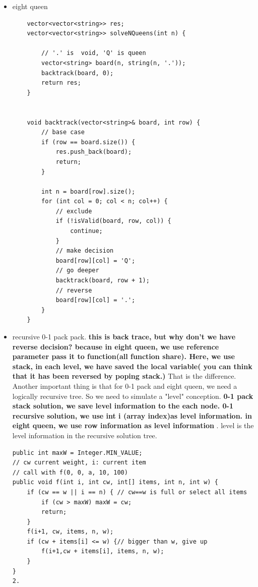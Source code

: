 \documentclass[a4paper,11pt,twoside]{book}
\begin{document}
\begin{itemize}
\begin{lstlisting}
				dp[i][w] = dp[i - 1][w];
			}
			else {
				
				dp[i][w] = max(
				dp[i - 1][w - wt[i - 1]] + val[i - 1],
				dp[i - 1][w]
				);
			}
		}
	}
	
	for (int i = 1; i <= N; i++) {
		for (int w = 1; w <= W; w++) {
			cout << dp[i][w] << " ";
		}
		cout << endl;
	}
	
	return dp[N][W];
}


int main()
{
	int W = 10;   // Weight of knapsack
	Item arr[] = { {2, 40}, {3.14, 50}, {1.98, 100},
		{5, 95}, {3, 30} };
	int n = sizeof(arr) / sizeof(arr[0]);
	
	cout << "Maximum possible profit = "
	<< knapsack(W, arr, n) << endl;
	
	//dp 
	knapsack_dp();
	
	//back track
	cout<<"back track"<< knapsack_back(W, arr, n) << endl;	
	return 0;
}
\end{lstlisting}


\item eight queen
\begin{lstlisting}
	vector<vector<string>> res;
	vector<vector<string>> solveNQueens(int n) {
		
		// '.' is  void, 'Q' is queen
		vector<string> board(n, string(n, '.'));
		backtrack(board, 0);
		return res;
	}
	
	
	void backtrack(vector<string>& board, int row) {
		// base case
		if (row == board.size()) {
			res.push_back(board);
			return;
		}
		
		int n = board[row].size();
		for (int col = 0; col < n; col++) {
			// exclude
			if (!isValid(board, row, col)) {
				continue;
			}
			// make decision
			board[row][col] = 'Q';
			// go deeper
			backtrack(board, row + 1);
			// reverse
			board[row][col] = '.';
		}
	}
\end{lstlisting}

\item recursive 0-1 pack pack. \textbf{this is back trace, but why don't we have reverse decision? because in eight queen, we use reference parameter pass it to function(all function share). Here, we use stack, in each level, we have saved the local variable( you can think that it has been reversed by poping stack.) } That is the difference.  Another important thing is that for 0-1 pack and eight queen,  we need a logically recursive tree. So we need to simulate a "level" conception.  \textbf{0-1 pack stack solution, we save level information to the each node. 0-1 recursive solution, we use int i (array index)as level information. in eight queen, we use row information as level information }. level is the level information in the recursive solution tree.  
\begin{lstlisting}
public int maxW = Integer.MIN_VALUE; 
// cw current weight, i: current item
// call with f(0, 0, a, 10, 100)
public void f(int i, int cw, int[] items, int n, int w) {
	if (cw == w || i == n) { // cw==w is full or select all items
		if (cw > maxW) maxW = cw;
		return;
	}
	f(i+1, cw, items, n, w);
	if (cw + items[i] <= w) {// bigger than w, give up
		f(i+1,cw + items[i], items, n, w);
	}
}
2.
\end{lstlisting}



\end{itemize}
\end{document}
